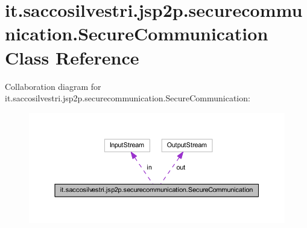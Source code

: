 \hypertarget{classit_1_1saccosilvestri_1_1jsp2p_1_1securecommunication_1_1_secure_communication}{
\section{it.saccosilvestri.jsp2p.securecommunication.\-Secure\-Communication \-Class \-Reference}
\label{classit_1_1saccosilvestri_1_1jsp2p_1_1securecommunication_1_1_secure_communication}
}


\-Collaboration diagram for it.saccosilvestri.jsp2p.securecommunication.\-Secure\-Communication\-:
\nopagebreak
\begin{figure}[H]
\begin{center}
\leavevmode
\includegraphics[width=350pt]{classit_1_1saccosilvestri_1_1jsp2p_1_1securecommunication_1_1_secure_communication__coll__graph}
\end{center}
\end{figure}
